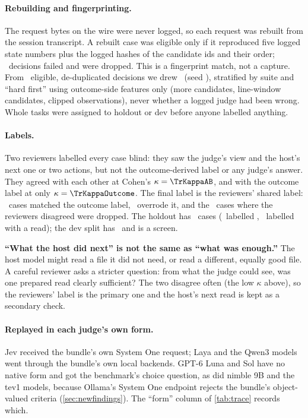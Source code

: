 \paragraph{Rebuilding and fingerprinting.} The request bytes on the wire were never logged, so each request
was rebuilt from the session transcript. A rebuilt case was eligible only if it reproduced five logged
state numbers plus the logged hashes of the candidate ids and their order; \TrRebuildFail\ decisions failed
and were dropped. This is a fingerprint match, not a capture. From \TrMined\ eligible, de-duplicated
decisions we drew \TrDrawn\ (seed \TrSeed), stratified by suite and ``hard first'' using outcome-side
features only (more candidates, line-window candidates, clipped observations), never whether a logged judge
had been wrong. Whole tasks were assigned to holdout or dev before anyone labelled anything.

\paragraph{Labels.} Two reviewers labelled every case blind: they saw the judge's view and the host's next
one or two actions, but not the outcome-derived label or any judge's answer. They agreed with each other
at Cohen's $\kappa = \TrKappaAB$, and with the outcome label at only $\kappa = \TrKappaOutcome$. The final
label is the reviewers' shared label: \TrAgreed\ cases matched the outcome label, \TrOverridden\ overrode
it, and the \TrDropped\ cases where the reviewers disagreed were dropped. The holdout has \TrN\ cases
(\TrReasonLabels\ labelled , \TrReadCases\ labelled with a read); the dev split has \TrDevN\
and is a screen.

\begin{keyidea}
\textbf{``What the host did next'' is not the same as ``what was enough.''} The host model might read a file
it did not need, or read a different, equally good file. A careful reviewer asks a stricter question: from
what the judge could see, was one prepared read clearly sufficient? The two disagree often (the low $\kappa$
above), so the reviewers' label is the primary one and the host's next read is kept as a secondary check.
\end{keyidea}

\paragraph{Replayed in each judge's own form.} Jev received the bundle's own System One request; Laya and
the Qwen3 models went through the bundle's own local backends. GPT-6 Luna and Sol have no native form and
got the benchmark's choice question, as did nimble 9B and the tev1 models, because Ollama's System One
endpoint rejects the bundle's object-valued criteria (\cref{sec:newfindings}). The ``form'' column of
\cref{tab:trace} records which.

